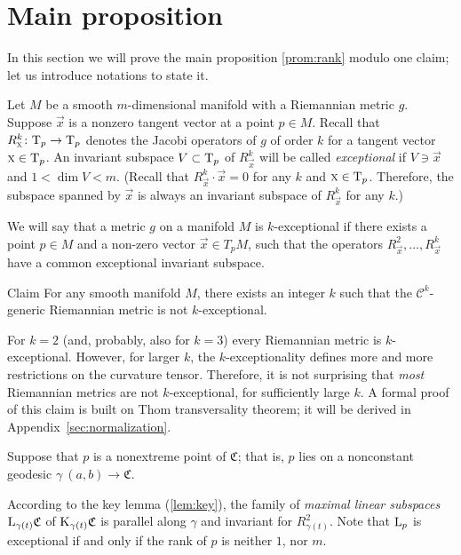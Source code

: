 \documentclass[a4paper,10pt]{article}
\begin{document}
\section{Main proposition}

In this section we will prove the main proposition \ref{prom:rank} modulo one claim; let us introduce notations to state it.

Let $M$ be a smooth $m$-dimensional manifold with a Riemannian metric $g$.
Suppose $\vec x$ is a nonzero tangent vector at a point $p\in M$.
Recall that $R^k_\vec x\:\T_p\z\to\T_p$ denotes the Jacobi operators of $g$ of order $k$ for a tangent vector $\text{\sc{x}}\in\mathrm{T}_p$.
An invariant subspace $V\subset \mathrm{T}_p$ of $R^k_\vec x$ will be called \emph{exceptional} if $V\ni \vec x$ and $1< \dim V<m$.
(Recall that $R^k_\vec x\cdot \vec x=0$
for any $k$ and $\text{\sc{x}}\in \mathrm{T}_p$.
Therefore, the subspace spanned by $\vec x$ is always an invariant subspace of $R^k_\vec x$ for any $k$.)

We will  say that a metric $g$ on a manifold $M$ is $k$-exceptional if there exists a point $p\in M$ and a non-zero vector $\vec x\in T_p M$,
such that the operators   $R^2_\vec x,\dots, R^k _\vec x$ have a common exceptional invariant subspace.  

\begin{thm}{Claim}\label{clm:codim-sigma} 
For any smooth manifold $M$, there exists an integer $k$ such that the 
$\mathcal C^k$-generic Riemannian metric is not $k$-exceptional.
\end{thm}

For $k=2$  (and, probably,  also for $k=3$) every Riemannian metric is $k$-exceptional.
However, for larger $k$, the
$k$-exceptionality defines more and more restrictions on the curvature tensor.
Therefore, it is not surprising that \emph{most}
Riemannian metrics are not $k$-exceptional, for sufficiently large $k$.
A formal proof of this claim is built on 
Thom transversality theorem;
it will be derived in Appendix~\ref{sec:normalization}.

Suppose that $p$ is a nonextreme point of $\mathfrak{C}$;
that is, $p$ lies on a nonconstant geodesic $\gamma\:(a,b)\to\mathfrak{C}$.

According to the key lemma (\ref{lem:key}), the family of \emph{maximal linear subspaces} $\mathrm{L}_{\gamma(t)}\mathfrak{C}$ of $\mathrm{K}_{\gamma(t)}\mathfrak{C}$ is parallel along $\gamma$ and invariant for $R^2_{\gamma(t)}$.
Note that $\mathrm{L}_p$ is exceptional if and only if the rank of $p$ is neither $1$, nor $m$.
\end{document}
